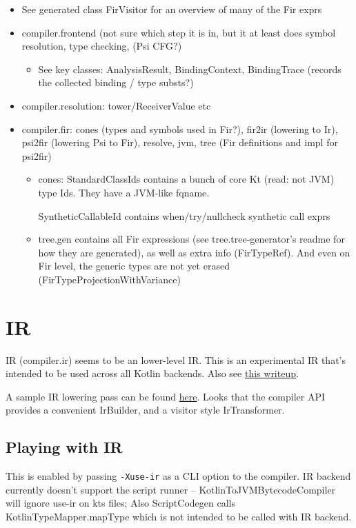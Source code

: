 \documentclass{article}
\begin{document}
\begin{itemize}
    \item See generated class FirVisitor for an overview of many of the Fir exprs
    \item compiler.frontend (not sure which step it is in, but it at least does symbol resolution, type checking, (Psi \textSafeTo CFG?)
    \begin{itemize}
        \item See key classes: AnalysisResult, BindingContext, BindingTrace (records the collected binding / type substs?)
    \end{itemize}
    \item compiler.resolution: tower/ReceiverValue etc
    \item compiler.fir: cones (types and symbols used in Fir?), fir2ir (lowering to Ir), psi2fir (lowering Psi to Fir), resolve, jvm, tree (Fir definitions and impl for psi2fir)
    \begin{itemize}
        \item cones: StandardClassIds contains a bunch of core Kt (read: not JVM) type Ids. They have a JVM-like fqname.

        SyntheticCallableId contains when/try/nullcheck synthetic call exprs

        \item tree.gen contains all Fir expressions (see tree.tree-generator's readme for how they are generated), as well as extra info (FirTypeRef). And even on Fir level, the generic types are not yet erased (FirTypeProjectionWithVariance)
    \end{itemize}
\end{itemize}

\section{IR}
\label{sec:ir}

IR (compiler.ir) seems to be an lower-level IR. This is an experimental IR that's intended to be used across all Kotlin backends. Also see \href{https://medium.com/@bnorm/exploring-kotlin-ir-bed8df167c23}{this writeup}.

A sample IR lowering pass can be found \href{https://github.com/JetBrains/kotlin/blob/936e53d/compiler/ir/backend.common/src/org/jetbrains/kotlin/backend/common/lower/TailrecLowering.kt}{here}. Looks that the compiler API provides a convenient IrBuilder, and a visitor style IrTransformer.

\subsection{Playing with IR}
This is enabled by passing \texttt{-Xuse-ir} as a CLI option to the compiler. IR backend currently doesn't support the script runner -- KotlinToJVMBytecodeCompiler will ignore use-ir on kts files; Also ScriptCodegen calls KotlinTypeMapper.mapType which is not intended to be called with IR backend.
\end{document}

